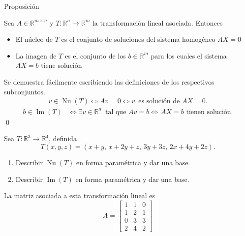\documentclass{beamer} %
\newcommand{\img}{\operatorname{Im}}
\newcommand{\nuc}{\operatorname{Nu}}
\newcommand{\im}{\operatorname{Im}}
\renewcommand\nu{\operatorname{Nu}}
\newcommand{\R}{\mathbb R}
\begin{document}
\begin{frame}



\begin{block}{Proposición}

Sea $A\in\R^{m\times n}$ y $T:\R^n\longrightarrow\R^m$ la transformación lineal asociada. Entonces
\begin{itemize}\pause
 \item El núcleo de $T$ es el conjunto de soluciones del sistema homogéneo $AX=0$
 \pause
 \item La imagen de $T$ es el conjunto de los $b\in\R^m$ para los cuales el sistema $AX=b$ tiene solución
\end{itemize}
\end{block}\pause
\begin{demostracion}\pause
    
\end{demostracion}
Se demuestra fácilmente escribiendo las definiciones de los respectivos subconjuntos.
\begin{align*}
v\in\nu(T)\Leftrightarrow Av=0\Leftrightarrow v\,\mbox{ es solución de $AX=0$.}
\end{align*}
\begin{align*}
b\in\im(T)&\Leftrightarrow\exists v\in\R^n\,\mbox{ tal que } Av=b 
\Leftrightarrow\,\mbox{$AX=b$ tienen solución}.
\end{align*}
\qed


\end{frame}



\begin{frame}
    \begin{ejemplo*}
        Sea $T: \R^3 \to \R^4$, definida
        $$
        T(x,y,z) = (x +y ,\,x +2y +z,\,3y +3z,\,2x +4y +2z).
        $$
        \begin{enumerate}
            \item Describir $\nuc(T)$  en forma paramétrica y dar una base.
            \item Describir $\img(T)$  en forma paramétrica y  dar una base. 
        \end{enumerate}
        \end{ejemplo*}\pause
        \begin{solucion}\pause
            La matriz asociada a esta transformación lineal  es 
            \begin{equation*}
                A = \begin{bmatrix}
                1&1&0\\1&2&1\\0&3&3\\2&4&2
                \end{bmatrix}
            \end{equation*}
        \end{solucion}
        \end{frame}
\end{document}
